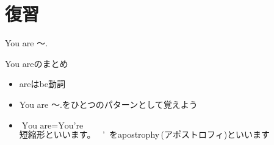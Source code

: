\documentclass[aspectratio=169,xcolor={dvipsnames,table}]{beamer}
\begin{document}
\section*{復習}
\begin{frame}[plain]{You are 〜.}
  \begin{alertblock}{You areのまとめ}
\begin{itemize}
 \item areはbe動詞
 \item You are 〜.をひとつのパターンとして覚えよう
 \item $\text{You are}=\text{You're}$\\
\mbox{}\hfill{}短縮形といいます。 \colorbox[gray]{0.9}{~'~}をapostrophy\,(アポストロフィ)といいます\phantom{あ}
\end{itemize}
     \end{alertblock}
\end{frame}
\end{document}
